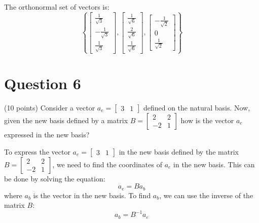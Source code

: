 \documentclass{article}
\begin{document}
\noindent
The orthonormal set of vectors is:
\[
\left\{
\begin{bmatrix}
\frac{1}{\sqrt{3}} \\
-\frac{1}{\sqrt{3}} \\
\frac{1}{\sqrt{3}}
\end{bmatrix},
\begin{bmatrix}
\frac{1}{\sqrt{6}} \\
\frac{2}{\sqrt{6}} \\
\frac{1}{\sqrt{6}}
\end{bmatrix},
\begin{bmatrix}
-\frac{1}{\sqrt{2}} \\
0 \\
\frac{1}{\sqrt{2}}
\end{bmatrix}
\right\}
\]

%
\vfill\break
\section*{Question 6} (10 points) Consider a vector $a_e = \begin{bmatrix}3 & 1\end{bmatrix}$ defined on the natural basis.  Now, given the new basis defined by a matrix $B = \begin{bmatrix}2 & 2 \\ -2 & 1\end{bmatrix}$ how is the vector $a_e$ expressed in the new basis?

\noindent
To express the vector $a_e = \begin{bmatrix}3 & 1\end{bmatrix}$ in the new basis defined by the matrix $B = \begin{bmatrix}2 & 2 \\ -2 & 1\end{bmatrix}$, we need to find the coordinates of $a_e$ in the new basis. This can be done by solving the equation:
\[
a_e = B a_b
\]
where $a_b$ is the vector in the new basis. To find $a_b$, we can use the inverse of the matrix $B$:
\[
a_b = B^{-1} a_e
\]
\end{document}
